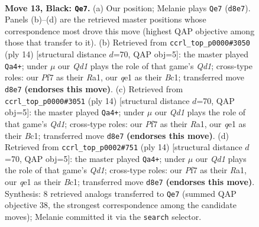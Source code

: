 \documentclass[11pt]{article}
\begin{document}
\clearpage

\begin{figure}[p]\centering
\begin{subfigure}{0.46\textwidth}\centering
\resizebox{\linewidth}{!}{%
\newchessgame
\chessboard[
  setfen={r1bq2k1/pppp1p1p/3n1bp1/8/8/1PN2P2/P1PP2PP/R1B1QBK1 b - - 0 13},
  showmover=false,
  pgfstyle=straightmove, color=movearrow, markmove={d8-e7}
]}
\caption{}
\end{subfigure}\hfill
\begin{subfigure}{0.46\textwidth}\centering
\resizebox{\linewidth}{!}{%
\newchessgame
\chessboard[
  setfen={rnbqkb1r/pp2pp1p/6p1/8/8/2P2N2/P2P1PPP/R1BQKB1R w KQkq - 0 8},
  showmover=false,
  pgfstyle=straightmove, color=movearrow, markmove={d1-a4}
]}
\caption{}
\end{subfigure}
\\[4pt]
\begin{subfigure}{0.46\textwidth}\centering
\resizebox{\linewidth}{!}{%
\newchessgame
\chessboard[
  setfen={rnbqkb1r/pp2pp1p/6p1/8/8/2P2N2/P2P1PPP/R1BQKB1R w KQkq - 0 8},
  showmover=false,
  pgfstyle=straightmove, color=movearrow, markmove={d1-a4}
]}
\caption{}
\end{subfigure}\hfill
\begin{subfigure}{0.46\textwidth}\centering
\resizebox{\linewidth}{!}{%
\newchessgame
\chessboard[
  setfen={rnbqkb1r/pp2pp1p/6p1/8/8/2P2N2/P2P1PPP/R1BQKB1R w KQkq - 0 8},
  showmover=false,
  pgfstyle=straightmove, color=movearrow, markmove={d1-a4}
]}
\caption{}
\end{subfigure}
\caption{\textbf{Move 13, Black: \texttt{Qe7}.} (a) Our position; Melanie plays \texttt{Qe7} (\texttt{d8e7}). Panels (b)--(d) are the retrieved master positions whose correspondence most drove this move (highest QAP objective among those that transfer to it). (b) Retrieved from \texttt{ccrl\_top\_p0000\#3050} (ply 14) [structural distance $d$=70, QAP obj=5]: the master played \texttt{Qa4+}; under $\mu$ our \emph{Qd1} plays the role of that game's \emph{Qd1}; cross-type roles: our \emph{P}f7 as their \emph{R}a1, our \emph{q}e1 as their \emph{B}c1; transferred move \texttt{d8e7} \textbf{(endorses this move)}. (c) Retrieved from \texttt{ccrl\_top\_p0000\#3051} (ply 14) [structural distance $d$=70, QAP obj=5]: the master played \texttt{Qa4+}; under $\mu$ our \emph{Qd1} plays the role of that game's \emph{Qd1}; cross-type roles: our \emph{P}f7 as their \emph{R}a1, our \emph{q}e1 as their \emph{B}c1; transferred move \texttt{d8e7} \textbf{(endorses this move)}. (d) Retrieved from \texttt{ccrl\_top\_p0002\#751} (ply 14) [structural distance $d$=70, QAP obj=5]: the master played \texttt{Qa4+}; under $\mu$ our \emph{Qd1} plays the role of that game's \emph{Qd1}; cross-type roles: our \emph{P}f7 as their \emph{R}a1, our \emph{q}e1 as their \emph{B}c1; transferred move \texttt{d8e7} \textbf{(endorses this move)}. Synthesis: 8 retrieved analogs transferred to \texttt{Qe7} (summed QAP objective 38, the strongest correspondence among the candidate moves); Melanie committed it via the \texttt{search} selector.}
\label{fig:thought-m25}
\end{figure}
\end{document}
